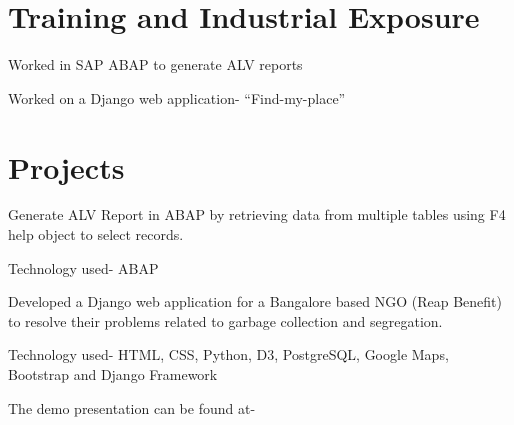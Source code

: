 \documentclass[]{resume-openfont}
\begin{document}
\hfill
\begin{minipage}[t]{0.66\textwidth} 


\section{Training and Industrial Exposure}

\vspace{\topsep} %
\begin{tightemize}\item Worked in SAP ABAP to generate ALV reports
\end{tightemize}

\sectionsep

\begin{tightemize}\item Worked on a Django web application- “Find-my-place”
\end{tightemize}

\sectionsep


\section{Projects}

Generate ALV Report in ABAP by retrieving data from multiple tables using F4 help object to select records. \\
\begin{tightemize}
\item Technology used- ABAP
\end{tightemize}
\sectionsep

Developed a Django web application for a Bangalore based NGO (Reap Benefit) to resolve their problems related to garbage collection and segregation. \\
\begin{tightemize}
\item Technology used- HTML, CSS, Python, D3, PostgreSQL, Google Maps, Bootstrap and Django Framework
\item The demo presentation can be found at- \href{https:/youtu.be/UP_KwSg6GIk/}{}
\end{tightemize}
\sectionsep


\end{minipage}
\end{document}
